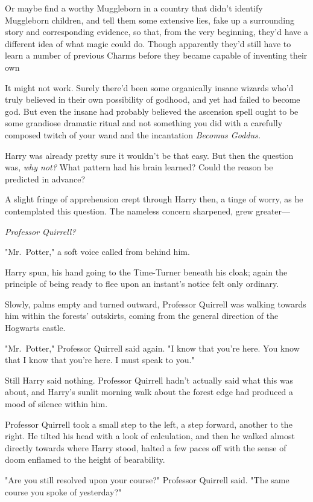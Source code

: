 Or maybe find a worthy Muggleborn in a country that didn't identify Muggleborn
children, and tell them some extensive lies, fake up a surrounding story and
corresponding evidence, so that, from the very beginning, they'd have a
different idea of what magic could do. Though apparently they'd still have to
learn a number of previous Charms before they became capable of inventing their
own{\el}

It might not work. Surely there'd been some organically insane wizards who'd
truly believed in their own possibility of godhood, and yet had failed to
become god. But even the insane had probably believed the ascension spell ought
to be some grandiose dramatic ritual and not something you did with a carefully
composed twitch of your wand and the incantation \emph{Becomus Goddus.}

Harry was already pretty sure it wouldn't be that easy. But then the question
was, \emph{why not?} What pattern had his brain learned? Could the reason be
predicted in advance?

A slight fringe of apprehension crept through Harry then, a tinge of worry, as
he contemplated this question. The nameless concern sharpened, grew greater—

\emph{Professor Quirrell?}

"Mr.~Potter," a soft voice called from behind him.

Harry spun, his hand going to the Time-Turner beneath his cloak; again the
principle of being ready to flee upon an instant's notice felt only ordinary.

Slowly, palms empty and turned outward, Professor Quirrell was walking towards
him within the forests' outskirts, coming from the general direction of the
Hogwarts castle.

"Mr.~Potter," Professor Quirrell said again. "I know that you're here. You know
that I know that you're here. I must speak to you."

Still Harry said nothing. Professor Quirrell hadn't actually said what this was
about, and Harry's sunlit morning walk about the forest edge had produced a
mood of silence within him.

Professor Quirrell took a small step to the left, a step forward, another to
the right. He tilted his head with a look of calculation, and then he walked
almost directly towards where Harry stood, halted a few paces off with the
sense of doom enflamed to the height of bearability.

"Are you still resolved upon your course?" Professor Quirrell said. "The same
course you spoke of yesterday?"

